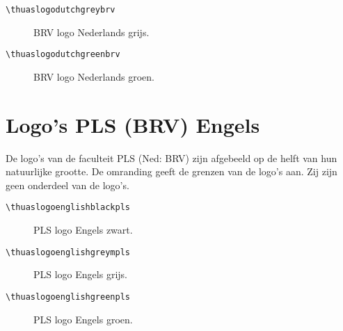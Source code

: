 \documentclass[a4paper,12pt]{article}
\begin{document}
\begin{verbatim}
\thuaslogodutchgreybrv
\end{verbatim}

\begin{figure}[H]
\centering\fboxsep=0pt%
\fbox{%
\scalebox{0.7071}{\thuaslogodutchgreybrv}}
\caption{BRV logo Nederlands grijs.}
\end{figure}

\begin{verbatim}
\thuaslogodutchgreenbrv
\end{verbatim}

\begin{figure}[H]
\centering\fboxsep=0pt%
\fbox{%
\scalebox{0.7071}{\thuaslogodutchgreenbrv}}
\caption{BRV logo Nederlands groen.}
\end{figure}


\section{Logo's PLS (BRV) Engels}
De logo's van de faculteit PLS (Ned: BRV) zijn afgebeeld op de helft van hun natuurlijke grootte.
De omranding geeft de grenzen van de logo's aan. Zij zijn geen onderdeel
van de logo's.

\begin{verbatim}
\thuaslogoenglishblackpls
\end{verbatim}

\begin{figure}[H]
\centering\fboxsep=0pt%
\fbox{%
\scalebox{0.7071}{\thuaslogoenglishblackpls}}
\caption{PLS logo Engels zwart.}
\end{figure}

\begin{verbatim}
\thuaslogoenglishgreympls
\end{verbatim}

\begin{figure}[H]
\centering\fboxsep=0pt%
\fbox{%
\scalebox{0.7071}{\thuaslogoenglishgreypls}}
\caption{PLS logo Engels grijs.}
\end{figure}

\begin{verbatim}
\thuaslogoenglishgreenpls
\end{verbatim}

\begin{figure}[H]
\centering\fboxsep=0pt%
\fbox{%
\scalebox{0.7071}{\thuaslogoenglishgreenpls}}
\caption{PLS logo Engels groen.}
\end{figure}
\end{document}
